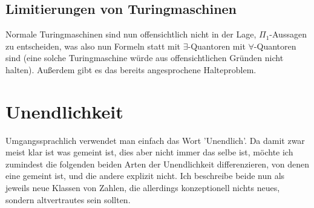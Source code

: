 \documentclass{scrartcl}
\begin{document}

\subsection{Limitierungen von Turingmaschinen}
Normale Turingmaschinen sind nun offensichtlich nicht in der Lage,
$\Pi_1$-Aussagen zu entscheiden, was also nun Formeln statt mit
$\exists$-Quantoren mit $\forall$-Quantoren sind (eine solche Turingmaschine
würde aus offensichtlichen Gründen nicht halten). Außerdem gibt es das bereits
angesprochene Halteproblem.


\section{Unendlichkeit}
Umgangssprachlich verwendet man einfach das Wort 'Unendlich'. Da damit zwar
meist klar ist was gemeint ist, dies aber nicht immer das selbe ist, möchte ich
zumindest die folgenden beiden Arten der Unendlichkeit differenzieren, von
denen eine gemeint ist, und die andere explizit nicht. Ich beschreibe beide nun
als jeweils neue Klassen von Zahlen, die allerdings konzeptionell nichts neues,
sondern altvertrautes sein sollten.
\end{document}
